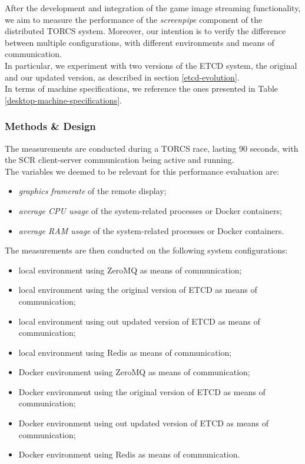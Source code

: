 After the development and integration of the game image streaming functionality, we aim to measure the performance of the \textit{screenpipe} component of the distributed TORCS system. Moreover, our intention is to verify the difference between multiple configurations, with different environments and means of communication. \\
In particular, we experiment with two versions of the ETCD system, the original and our updated version, as described in section \ref{etcd-evolution}. \\
In terms of machine specifications, we reference the ones presented in Table \ref{desktop-machine-specifications}.

\subsubsection{Methods \& Design}
The measurements are conducted during a TORCS race, lasting 90 seconds, with the SCR client-server communication being active and running. \\
The variables we deemed to be relevant for this performance evaluation are:
\begin{itemize}
	\item \textit{graphics framerate} of the remote display;
	\item \textit{average CPU usage} of the system-related processes or Docker containers;
	\item \textit{average RAM usage} of the system-related processes or Docker containers.
\end{itemize}
The measurements are then conducted on the following system configurations:
\begin{itemize}
	\item local environment using ZeroMQ as means of communication;
	\item local environment using the original version of ETCD as means of communication;
	\item local environment using out updated version of ETCD as means of communication;
	\item local environment using Redis as means of communication;
	\item Docker environment using ZeroMQ as means of communication;
	\item Docker environment using the original version of ETCD as means of communication;
	\item Docker environment using out updated version of ETCD as means of communication;
	\item Docker environment using Redis as means of communication.
\end{itemize}
